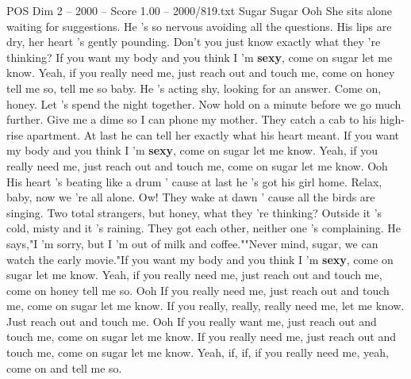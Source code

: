 \begin{textsample}{POS Dim 2 – 2000 – Score 1.00 – 2000/819.txt}  \label{ex:f2_pos_016}
Sugar Sugar Ooh She sits alone waiting for suggestions.
He 's so nervous avoiding all the questions.
His lips are dry, her heart 's gently pounding.
Don't you just know exactly what they 're thinking?
If you want my body and you think I 'm \textbf{sexy}, come on sugar let me know.
Yeah, if you really need me, just reach out and touch me, come on honey tell me so, tell me so baby.
He 's acting shy, looking for an answer.
Come on, honey.
Let 's spend the night together.
Now hold on a minute before we go much further.
Give me a dime so I can phone my mother.
They catch a cab to his high-rise apartment.
At last he can tell her exactly what his heart meant.
If you want my body and you think I 'm \textbf{sexy}, come on sugar let me know.
Yeah, if you really need me, just reach out and touch me, come on sugar let me know.
Ooh His heart 's beating like a drum ' cause at last he 's got his girl home.
Relax, baby, now we 're all alone.
Ow!
They wake at dawn ' cause all the birds are singing.
Two total strangers, but honey, what they 're thinking?
Outside it 's cold, misty and it 's raining.
They got each other, neither one 's complaining.
He says,"I 'm sorry, but I 'm out of milk and coffee.""Never mind, sugar, we can watch the early movie."If you want my body and you think I 'm \textbf{sexy}, come on sugar let me know.
Yeah, if you really need me, just reach out and touch me, come on honey tell me so.
Ooh If you really need me, just reach out and touch me, come on sugar let me know.
If you really, really, really need me, let me know.
Just reach out and touch me.
Ooh If you really want me, just reach out and touch me, come on sugar let me know.
If you really need me, just reach out and touch me, come on sugar let me know.
Yeah, if, if, if you really need me, yeah, come on and tell me so.

\end{textsample}
